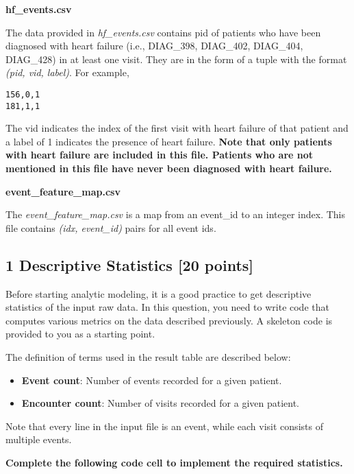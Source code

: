 \documentclass[11pt]{article}
\providecommand{\tightlist}{%
      \setlength{\itemsep}{0pt}\setlength{\parskip}{0pt}}
\begin{document}
    \textbf{hf\_events.csv}

The data provided in \emph{hf\_events.csv} contains pid of patients who
have been diagnosed with heart failure (i.e., DIAG\_398, DIAG\_402,
DIAG\_404, DIAG\_428) in at least one visit. They are in the form of a
tuple with the format \emph{(pid, vid, label)}. For example,

\begin{verbatim}
156,0,1
181,1,1
\end{verbatim}

The vid indicates the index of the first visit with heart failure of
that patient and a label of 1 indicates the presence of heart failure.
\textbf{Note that only patients with heart failure are included in this
file. Patients who are not mentioned in this file have never been
diagnosed with heart failure.}

    \textbf{event\_feature\_map.csv}

The \emph{event\_feature\_map.csv} is a map from an event\_id to an
integer index. This file contains \emph{(idx, event\_id)} pairs for all
event ids.

    \hypertarget{descriptive-statistics-20-points}{%
\subsection{1 Descriptive Statistics {[}20
points{]}}\label{descriptive-statistics-20-points}}

Before starting analytic modeling, it is a good practice to get
descriptive statistics of the input raw data. In this question, you need
to write code that computes various metrics on the data described
previously. A skeleton code is provided to you as a starting point.

The definition of terms used in the result table are described below:

\begin{itemize}
\tightlist
\item
  \textbf{Event count}: Number of events recorded for a given patient.
\item
  \textbf{Encounter count}: Number of visits recorded for a given
  patient.
\end{itemize}

Note that every line in the input file is an event, while each visit
consists of multiple events.

    \textbf{Complete the following code cell to implement the required
statistics.}
\end{document}
